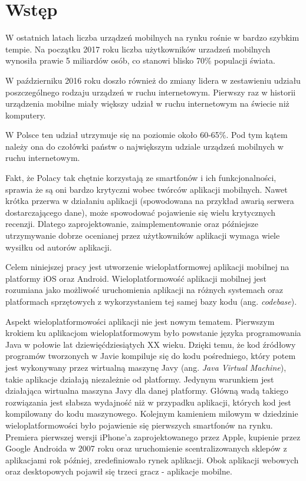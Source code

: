\chapter*{Wstęp}
W ostatnich latach liczba urządzeń mobilnych na rynku rośnie w bardzo szybkim tempie. Na początku 2017 roku liczba użytkowników urzadzeń mobilnych wynosiła prawie 5 miliardów osób, co stanowi blisko 70\% populacji świata. \cite{Digitali12:online} 

W październiku 2016 roku doszło również do zmiany lidera w zestawieniu udziału poszczególnego rodzaju urządzeń w ruchu internetowym. Pierwszy raz w historii urządzenia mobilne miały większy udział w ruchu internetowym na świecie niż komputery. \cite{Mobilean2:online} 

W Polsce ten udział utrzymuje się na poziomie około 60-65\%. Pod tym kątem należy ona do czołówki państw o największym udziale urządzeń mobilnych w ruchu internetowym. \cite{Desktopv13:online}

Fakt, że Polacy tak chętnie korzystają ze smartfonów i ich funkcjonalności, sprawia że są oni bardzo krytyczni wobec twórców aplikacji mobilnych. Nawet krótka przerwa w działaniu aplikacji (spowodowana na przykład awarią serwera dostarczającego dane), może spowodować pojawienie się wielu krytycznych recenzji. Dlatego zaprojektowanie, zaimplementowanie oraz późniejsze utrzymywanie dobrze ocenianej przez użytkowników aplikacji wymaga wiele wysiłku od autorów aplikacji.

Celem niniejszej pracy jest utworzenie wieloplatformowej aplikacji mobilnej na platformy iOS oraz Android. Wieloplatformowość aplikacji mobilnej jest rozumiana jako możliwość uruchomienia aplikacji na różnych systemach oraz platformach sprzętowych z wykorzystaniem tej samej bazy kodu (ang. \textit{codebase}).

Aspekt wieloplatformowości aplikacji nie jest nowym tematem. Pierwszym krokiem ku aplikacjom wieloplatformowym było powstanie języka programowania Java w połowie lat dziewięćdziesiątych XX wieku. Dzięki temu, że kod źródłowy programów tworzonych w Javie kompiluje się do kodu pośredniego, który potem jest wykonywany przez wirtualną maszynę Javy (ang. \textit{Java Virtual Machine}), takie aplikacje działają niezależnie od platformy. Jedynym warunkiem jest działająca wirtualna maszyna Javy dla danej platformy. Główną wadą takiego rozwiązania jest słabsza wydajność niż w przypadku aplikacji, których kod jest kompilowany do kodu maszynowego. 
\newpage
Kolejnym kamieniem milowym w dziedzinie wieloplatformowości było pojawienie się pierwszych smartfonów na rynku. Premiera pierwszej wersji iPhone'a zaprojektowanego przez Apple, kupienie przez Google Androida w 2007 roku oraz uruchomienie scentralizowanych sklepów z aplikacjami rok później, zredefiniowało rynek aplikacji. Obok aplikacji webowych oraz desktopowych pojawił się trzeci gracz - aplikacje mobilne. 

